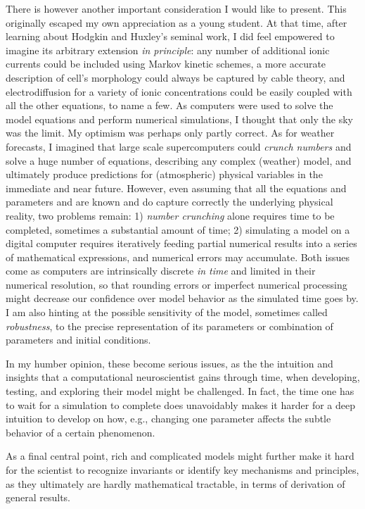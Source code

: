 There is however another important consideration I would like to present. This originally escaped my own appreciation as a young student. At that time, after learning about Hodgkin and Huxley's seminal work, I did feel empowered to imagine its arbitrary extension \textit{in principle}: any number of additional ionic currents could be included using Markov kinetic schemes, a more accurate description of cell's morphology could always be captured by cable theory, and electrodiffusion for a variety of ionic concentrations could be easily coupled with all the other equations, to name a few. As computers were used to solve the model equations and perform numerical simulations, I thought that only the sky was the limit. My optimism was perhaps only partly correct. As for weather forecasts, I imagined that large scale supercomputers could \textit{crunch numbers} and solve a huge number of equations, describing any complex (weather) model, and ultimately produce predictions for (atmospheric) physical variables in the immediate and near future. However, even assuming that all the equations and parameters and are known and do capture correctly the underlying physical reality, two problems remain: 1) \textit{number crunching} alone requires time to be completed, sometimes a substantial amount of time; 2) simulating a model on a digital computer requires iteratively feeding partial numerical results into a series of mathematical expressions, and numerical errors may accumulate. Both issues come as computers are intrinsically discrete \textit{in time} and limited in their numerical resolution, so that rounding errors or imperfect numerical processing might decrease our confidence over model behavior as the simulated time goes by. I am also hinting at the possible sensitivity of the model, sometimes called \textit{robustness}, to the precise representation of its parameters or combination of parameters and initial conditions. 

In my humber opinion, these become serious issues, as the the intuition and insights that a computational neuroscientist gains through time, when developing, testing, and exploring their model might be challenged. In fact, the time one has to wait for a simulation to complete does unavoidably makes it harder for a deep intuition to develop on how, e.g., changing one parameter affects the subtle behavior of a certain phenomenon. 

As a final central point, rich and complicated models might further make it hard for the scientist to recognize invariants or identify key mechanisms and principles, as they ultimately are hardly mathematical tractable, in terms of derivation of general results.

